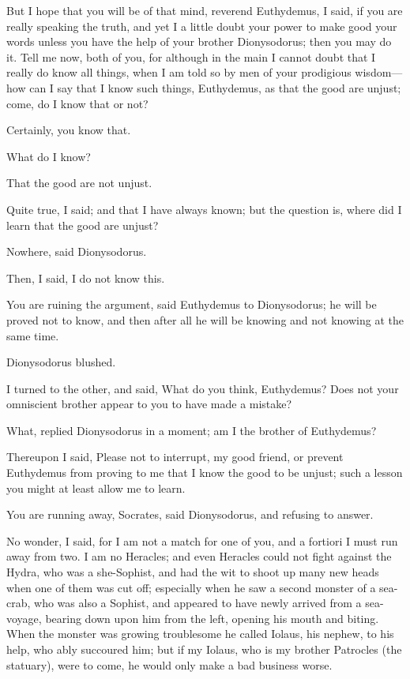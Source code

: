 \documentclass[11pt,letter]{article}
\begin{document}
\par  But I hope that you will be of that mind, reverend Euthydemus, I said, if you are really speaking the truth, and yet I a little doubt your power to make good your words unless you have the help of your brother Dionysodorus; then you may do it. Tell me now, both of you, for although in the main I cannot doubt that I really do know all things, when I am told so by men of your prodigious wisdom—how can I say that I know such things, Euthydemus, as that the good are unjust; come, do I know that or not?

\par  Certainly, you know that.

\par  What do I know?

\par  That the good are not unjust.

\par  Quite true, I said; and that I have always known; but the question is, where did I learn that the good are unjust?

\par  Nowhere, said Dionysodorus.

\par  Then, I said, I do not know this.

\par  You are ruining the argument, said Euthydemus to Dionysodorus; he will be proved not to know, and then after all he will be knowing and not knowing at the same time.

\par  Dionysodorus blushed.

\par  I turned to the other, and said, What do you think, Euthydemus? Does not your omniscient brother appear to you to have made a mistake?

\par  What, replied Dionysodorus in a moment; am I the brother of Euthydemus?

\par  Thereupon I said, Please not to interrupt, my good friend, or prevent Euthydemus from proving to me that I know the good to be unjust; such a lesson you might at least allow me to learn.

\par  You are running away, Socrates, said Dionysodorus, and refusing to answer.

\par  No wonder, I said, for I am not a match for one of you, and a fortiori I must run away from two. I am no Heracles; and even Heracles could not fight against the Hydra, who was a she-Sophist, and had the wit to shoot up many new heads when one of them was cut off; especially when he saw a second monster of a sea-crab, who was also a Sophist, and appeared to have newly arrived from a sea-voyage, bearing down upon him from the left, opening his mouth and biting. When the monster was growing troublesome he called Iolaus, his nephew, to his help, who ably succoured him; but if my Iolaus, who is my brother Patrocles (the statuary), were to come, he would only make a bad business worse.
\end{document}
